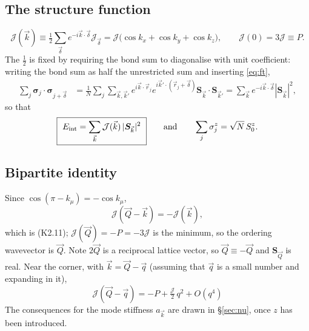 \documentclass[11pt,a4paper]{article}
\newcommand{\Jc}{\mathcal{J}}
\newcommand{\kB}{k_{\mathrm B}}
\newcommand{\bk}{\vec k}
\newcommand{\bQ}{\vec Q}
\newcommand{\bq}{\vec q}
\newcommand{\brr}{\vec r}
\newcommand{\bdel}{\vec\delta}
\newcommand{\Jc}{\mathcal{J}}
\newcommand{\kB}{k_{\mathrm B}}
\newcommand{\bk}{\vec k}
\newcommand{\bQ}{\vec Q}
\newcommand{\bq}{\vec q}
\begin{document}
\subsection{The structure function}
\begin{equation}
  \Jc(\bk)\equiv\tfrac12\sum_{\bdel}e^{-i\bk\cdot\bdel}\Jc_{\bdel}
   =\Jc\big(\cos k_x+\cos k_y+\cos k_z\big),
  \qquad \Jc(0)=3\Jc\equiv P .
  \label{eq:structure}
\end{equation}
The $\tfrac12$ is fixed by requiring the bond sum to diagonalise with unit coefficient:
writing the bond sum as half the unrestricted sum and inserting \eqref{eq:ft},
\begin{align}
  \sum_j\bm\sigma_j\cdot\bm\sigma_{j+\bdel}
  &=\frac1N\sum_j\sum_{\bk,\bk'}e^{i\bk\cdot\brr_j}e^{i\bk'\cdot(\brr_j+\bdel)}\bm S_{\bk}\cdot\bm S_{\bk'}
   =\sum_{\bk}e^{-i\bk\cdot\bdel}|\bm S_{\bk}|^2,
\end{align}
so that
\begin{equation}
  \boxed{\ E_{\rm int}=\sum_{\bk}\Jc(\bk)\,|\bm S_{\bk}|^2\ }
  \qquad\text{and}\qquad
  \sum_j\sigma^z_j=\sqrt N\,S^z_0 .
  \label{eq:diag}
\end{equation}

\subsection{Bipartite identity}
Since $\cos(\pi-k_\mu)=-\cos k_\mu$,
\begin{equation}
  \Jc(\bQ-\bk)=-\Jc(\bk),
  \label{eq:bipartite}
\end{equation}
which is (K2.11); $\Jc(\bQ)=-P =-3\mathcal{J}$ is the minimum, so the ordering wavevector is $\bQ$. Note
$2\bQ$ is a reciprocal lattice vector, so $\bQ\equiv-\bQ$ and $\bm S_{\bQ}$ is real. Near
the corner, with $\bk=\bQ-\bq$ (assuming that $\vec q$ is a small number and expanding in it),
\begin{equation}
  \boxed{\ \Jc(\bQ-\bq)=-P+\tfrac{\Jc}{2}\,q^2+O(q^4)\ }
  \label{eq:smallq}
\end{equation}
The consequences for the mode stiffness $a_{\bk}$ are drawn in \S\ref{sec:nu}, once $z$ has
been introduced.
\end{document}
